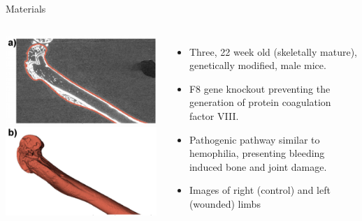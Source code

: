 \documentclass[10pt,aspectratio=169]{beamer}
\begin{document}
\begin{frame}[fragile]{Materials}
\begin{columns}[onlytextwidth]
    \centering
    \includegraphics[width=0.99\textwidth]{figures/bone_materials_femur_highlight.png}\\
    \vspace{0.5cm}
    \includegraphics[width=0.99\textwidth]{figures/bone_materials_femur_3D.png}
    \centering
    \begin{itemize} \itemsep1em
        \item Three, 22 week old (skeletally mature), genetically modified, male mice.
        \item F8 gene knockout preventing the generation of protein coagulation factor VIII.
        \item Pathogenic pathway similar to hemophilia, presenting bleeding induced bone and joint damage.
        \item Images of right (control) and left (wounded) limbs
    \end{itemize}
\end{columns}
\end{frame}
\end{document}
